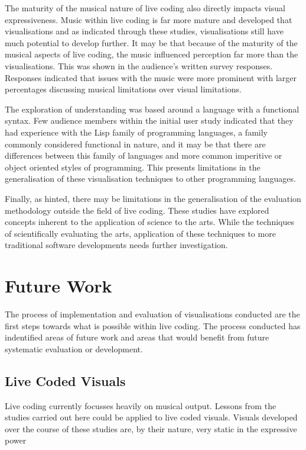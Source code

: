 The maturity of the musical nature of live coding also directly impacts visual expressiveness. Music within live coding is far more mature and developed that visualisations and as indicated through these studies, visualisations still have much potential to develop further. It may be that because of the maturity of the musical aspects of live coding, the music influenced perception far more than the visualisations. This was shown in the audience's written survey responses. Responses indicated that issues with the music were more prominent with larger percentages discussing musical limitations over visual limitations.

The exploration of understanding was based around a language with a functional syntax. Few audience members within the initial user study indicated that they had experience with the Lisp family of programming languages, a family commonly considered functional in nature, and it may be that there are differences between this family of languages and more common imperitive or object oriented styles of programming. This presents limitations in the generalisation of these visualisation techniques to other programming languages.

Finally, as hinted, there may be limitations in the generalisation of the evaluation methodology outside the field of live coding. These studies have explored concepts inherent to the application of science to the arts. While the techniques of scientifically evaluating the arts, application of these techniques to more traditional software developments needs further investigation.

\section{Future Work}

The process of implementation and evaluation of visualisations conducted are the first steps towards what is possible within live coding. The process conducted has indentified areas of future work and areas that would benefit from future systematic evaluation or development.

\subsection{Live Coded Visuals}

Live coding currently focusses heavily on musical output. Lessons from the studies carried out here could be applied to live coded visuals. Visuals developed over the course of these studies are, by their nature, very static in the expressive power 

